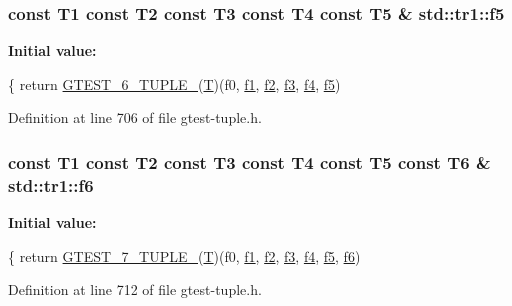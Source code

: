 \subsubsection[{\texorpdfstring{f5}{f5}}]{\setlength{\rightskip}{0pt plus 5cm}const T1 const T2 const T3 const T4 const T5 \& std\+::tr1\+::f5}\hypertarget{namespacestd_1_1tr1_a9c1eb66b2b2fa321942af95405232a0d}{}\label{namespacestd_1_1tr1_a9c1eb66b2b2fa321942af95405232a0d}
{\bfseries Initial value\+:}
\begin{DoxyCode}
\{
  \textcolor{keywordflow}{return} \hyperlink{gtest-tuple_8h_a53f36c86a979ed8285bf3c6f82f16483}{GTEST\_6\_TUPLE\_}(\hyperlink{all__17_8js_adf1f3edb9115acb0a1e04209b7a9937b}{T})(f0, \hyperlink{namespacestd_1_1tr1_a9c0fa65b105f8e2f58ba59ecf75fd000}{f1}, \hyperlink{namespacestd_1_1tr1_a87dd9e009868361317f587126dba63d4}{f2}, \hyperlink{namespacestd_1_1tr1_a0f7c3b47d27d42d82d1a333ea420ce4e}{f3}, \hyperlink{namespacestd_1_1tr1_adc796e02b7385d526aff708189564f67}{f4}, \hyperlink{namespacestd_1_1tr1_a9c1eb66b2b2fa321942af95405232a0d}{f5})
\end{DoxyCode}


Definition at line 706 of file gtest-\/tuple.\+h.

\subsubsection[{\texorpdfstring{f6}{f6}}]{\setlength{\rightskip}{0pt plus 5cm}const T1 const T2 const T3 const T4 const T5 const T6 \& std\+::tr1\+::f6}\hypertarget{namespacestd_1_1tr1_a6b62f32e1e3e21bceb94eb46c4cbfd56}{}\label{namespacestd_1_1tr1_a6b62f32e1e3e21bceb94eb46c4cbfd56}
{\bfseries Initial value\+:}
\begin{DoxyCode}
\{
  \textcolor{keywordflow}{return} \hyperlink{gtest-tuple_8h_a8987baf82ee028d1d778447413a02c0c}{GTEST\_7\_TUPLE\_}(\hyperlink{all__17_8js_adf1f3edb9115acb0a1e04209b7a9937b}{T})(f0, \hyperlink{namespacestd_1_1tr1_a9c0fa65b105f8e2f58ba59ecf75fd000}{f1}, \hyperlink{namespacestd_1_1tr1_a87dd9e009868361317f587126dba63d4}{f2}, \hyperlink{namespacestd_1_1tr1_a0f7c3b47d27d42d82d1a333ea420ce4e}{f3}, \hyperlink{namespacestd_1_1tr1_adc796e02b7385d526aff708189564f67}{f4}, \hyperlink{namespacestd_1_1tr1_a9c1eb66b2b2fa321942af95405232a0d}{f5}, \hyperlink{namespacestd_1_1tr1_a6b62f32e1e3e21bceb94eb46c4cbfd56}{f6})
\end{DoxyCode}


Definition at line 712 of file gtest-\/tuple.\+h.

